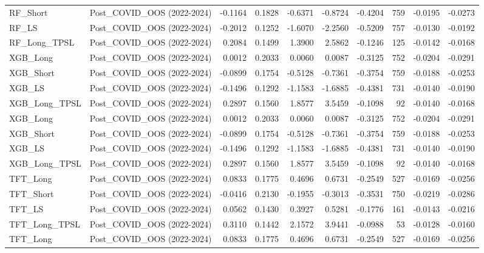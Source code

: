 \begin{tabular}{llrrrrrrrr}
\cline{1-10}
RF\_Short & Post\_COVID\_OOS (2022-2024) & -0.1164 & 0.1828 & -0.6371 & -0.8724 & -0.4204 & 759 & -0.0195 & -0.0273 \\
\cline{1-10}
RF\_LS & Post\_COVID\_OOS (2022-2024) & -0.2012 & 0.1252 & -1.6070 & -2.2560 & -0.5209 & 757 & -0.0130 & -0.0192 \\
\cline{1-10}
RF\_Long\_TPSL & Post\_COVID\_OOS (2022-2024) & 0.2084 & 0.1499 & 1.3900 & 2.5862 & -0.1246 & 125 & -0.0142 & -0.0168 \\
\cline{1-10}
XGB\_Long & Post\_COVID\_OOS (2022-2024) & 0.0012 & 0.2033 & 0.0060 & 0.0087 & -0.3125 & 752 & -0.0204 & -0.0291 \\
\cline{1-10}
XGB\_Short & Post\_COVID\_OOS (2022-2024) & -0.0899 & 0.1754 & -0.5128 & -0.7361 & -0.3754 & 759 & -0.0188 & -0.0253 \\
\cline{1-10}
XGB\_LS & Post\_COVID\_OOS (2022-2024) & -0.1496 & 0.1292 & -1.1583 & -1.6885 & -0.4381 & 731 & -0.0140 & -0.0190 \\
\cline{1-10}
XGB\_Long\_TPSL & Post\_COVID\_OOS (2022-2024) & 0.2897 & 0.1560 & 1.8577 & 3.5459 & -0.1098 & 92 & -0.0140 & -0.0168 \\
\cline{1-10}
XGB\_Long & Post\_COVID\_OOS (2022-2024) & 0.0012 & 0.2033 & 0.0060 & 0.0087 & -0.3125 & 752 & -0.0204 & -0.0291 \\
\cline{1-10}
XGB\_Short & Post\_COVID\_OOS (2022-2024) & -0.0899 & 0.1754 & -0.5128 & -0.7361 & -0.3754 & 759 & -0.0188 & -0.0253 \\
\cline{1-10}
XGB\_LS & Post\_COVID\_OOS (2022-2024) & -0.1496 & 0.1292 & -1.1583 & -1.6885 & -0.4381 & 731 & -0.0140 & -0.0190 \\
\cline{1-10}
XGB\_Long\_TPSL & Post\_COVID\_OOS (2022-2024) & 0.2897 & 0.1560 & 1.8577 & 3.5459 & -0.1098 & 92 & -0.0140 & -0.0168 \\
\cline{1-10}
TFT\_Long & Post\_COVID\_OOS (2022-2024) & 0.0833 & 0.1775 & 0.4696 & 0.6731 & -0.2549 & 527 & -0.0169 & -0.0256 \\
\cline{1-10}
TFT\_Short & Post\_COVID\_OOS (2022-2024) & -0.0416 & 0.2130 & -0.1955 & -0.3013 & -0.3531 & 750 & -0.0219 & -0.0286 \\
\cline{1-10}
TFT\_LS & Post\_COVID\_OOS (2022-2024) & 0.0562 & 0.1430 & 0.3927 & 0.5281 & -0.1776 & 161 & -0.0143 & -0.0216 \\
\cline{1-10}
TFT\_Long\_TPSL & Post\_COVID\_OOS (2022-2024) & 0.3110 & 0.1442 & 2.1572 & 3.9441 & -0.0988 & 53 & -0.0128 & -0.0160 \\
\cline{1-10}
TFT\_Long & Post\_COVID\_OOS (2022-2024) & 0.0833 & 0.1775 & 0.4696 & 0.6731 & -0.2549 & 527 & -0.0169 & -0.0256 \\

\end{tabular}
